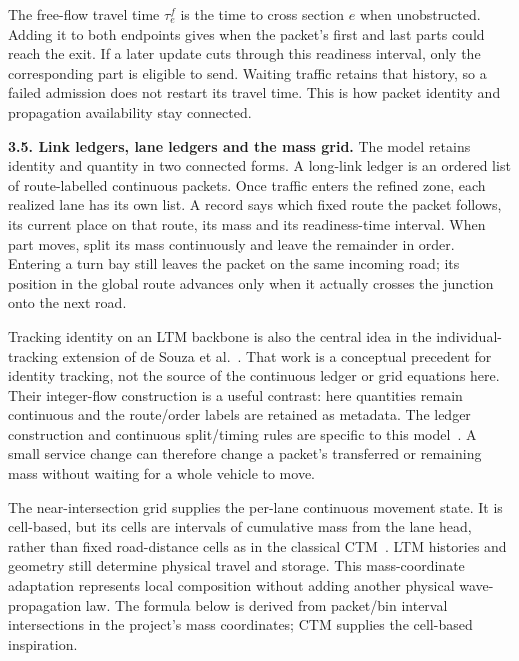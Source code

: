\documentclass[10pt,a4paper]{article}
\begin{document}
The free-flow travel time $\tau^f_e$ is the time to cross section $e$
when unobstructed. Adding it to both endpoints gives when the packet's
first and last parts could reach the exit. If a later update cuts through
this readiness interval, only the corresponding part is eligible to send.
Waiting traffic retains that history, so a failed admission does not
restart its travel time. This is how packet identity and propagation
availability stay connected.
\par


\textbf{3.5. Link ledgers, lane ledgers and the mass grid.}
The model retains identity and quantity in two connected forms.
A long-link ledger is an ordered list of route-labelled continuous
packets. Once traffic enters the refined zone, each realized lane has
its own list. A record says which fixed route the packet follows, its
current place on that route, its mass and its readiness-time interval.
When part moves, split its mass continuously and leave the remainder
in order. Entering a turn bay still leaves the packet on the same incoming road;
its position in the global route advances only when it actually crosses
the junction onto the next road.

Tracking identity on an LTM backbone is also the central idea in the
individual-tracking extension of de Souza et al.~\cite{tracking}.
That work is a conceptual precedent for identity tracking, not the source of the continuous ledger or grid equations here.
Their integer-flow construction is a useful contrast: here quantities
remain continuous and the route/order labels are retained as metadata.
The ledger construction and continuous split/timing rules are specific
to this model~\cite{m1}. A small service change can therefore change a
packet's transferred or remaining mass without waiting for a whole
vehicle to move.

The near-intersection grid supplies the per-lane continuous movement
state. It is cell-based, but its cells are intervals of cumulative mass
from the lane head, rather than fixed road-distance cells as in the
classical CTM~\cite{ctm}. LTM histories and geometry still determine
physical travel and storage. This mass-coordinate adaptation represents
local composition without adding another physical wave-propagation law.
The formula below is derived from packet/bin interval intersections in the project's mass coordinates; CTM supplies the cell-based inspiration.
\end{document}
